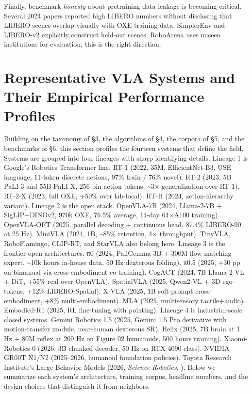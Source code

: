 \documentclass{article}
\begin{document}
Finally, benchmark \emph{honesty} about pretraining-data leakage is becoming critical. Several 2024 papers reported high LIBERO numbers without disclosing that LIBERO scenes overlap visually with OXE training data. SimplerEnv and LIBERO-v2 explicitly construct held-out scenes; RoboArena uses unseen institutions for evaluation; this is the right direction.

\section{Representative VLA Systems and Their Empirical Performance Profiles}\label{representative-vla-systems-and-their-empirical-performance-profiles}

Building on the taxonomy of §3, the algorithms of §4, the corpora of §5, and the benchmarks of §6, this section profiles the fourteen systems that define the field. Systems are grouped into four lineages with sharp identifying details. Lineage 1 is Google's Robotics Transformer line. RT-1 (2022, 35M, EfficientNet-B3, USE language, 11-token discrete actions, 97\% train / 76\% novel). RT-2 (2023, 5B PaLI-3 and 55B PaLI-X, 256-bin action tokens, \textasciitilde3× generalization over RT-1). RT-2-X (2023, full OXE, +50\% over lab-local). RT-H (2024, action-hierarchy variant). Lineage 2 is the open stack. OpenVLA-7B (2024, Llama-2-7B + SigLIP+DINOv2, 970k OXE, 76.5\% average, 14-day 64×A100 training). OpenVLA-OFT (2025, parallel decoding + continuous head, 87.4\% LIBERO-90 at 25 Hz). MiniVLA (2024, 1B, \textasciitilde85\% retention, 4× throughput). TinyVLA, RoboFlamingo, CLIP-RT, and StarVLA also belong here. Lineage 3 is the frontier open architectures. π0 (2024, PaliGemma-3B + 300M flow-matching expert, \textasciitilde10k hours in-house data, 50 Hz dexterous folding). π0.5 (2025, +30 pp on bimanual via cross-embodiment co-training). CogACT (2024, 7B Llama-2-VL + DiT, +55\% real over OpenVLA). SpatialVLA (2025, Qwen2-VL + 3D ego-tokens, +12\% LIBERO-Spatial). X-VLA (2025, 1B soft-prompt cross-embodiment, +8\% multi-embodiment). MLA (2025, multisensory tactile+audio). Embodied-R1 (2025, RL fine-tuning with pointing). Lineage 4 is industrial-scale closed systems. Gemini Robotics 1.5 (2025, Gemini 1.5 Pro derivative with motion-transfer module, near-human dexterous SR). Helix (2025, 7B brain at 1 Hz + 80M reflex at 200 Hz on Figure 02 humanoids, 500 hours training). Xiaomi-Robotics-0 (2026, 3B chunked decoder, 50 Hz on RTX 4090 class). NVIDIA GR00T N1/N2 (2025--2026, humanoid foundation policies). Toyota Research Institute's Large Behavior Models (2026, \emph{Science Robotics}, \cite{barreiros2026acarefulexaminatio}). Below we summarize each system's architecture, training corpus, headline numbers, and the design choices that distinguish it from neighbors.
\end{document}
